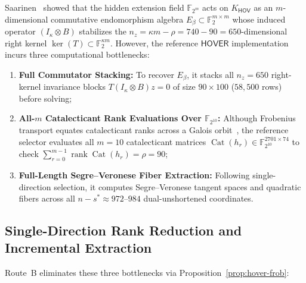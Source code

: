 \documentclass[11pt,a4paper]{article}
\theoremstyle{definition}
\theoremstyle{remark}
\newcommand{\F}{\mathbb{F}}
\newcommand{\rk}{\operatorname{rank}}
\newcommand{\Cat}{\operatorname{Cat}}
\newcommand{\HOV}{\mathsf{HOV}}
\newcommand{\HOVER}{\mathsf{HOVER}}
\begin{document}
Saarinen~\cite{Saa26a} showed that the hidden extension field $\F_{2^m}$ acts on $K_{\HOV}$ as an $m$-dimensional commutative endomorphism algebra $E_\beta \subset \F_2^{m \times m}$ whose induced operator $(I_\kappa \otimes B)$ stabilizes the $n_z = \kappa m - \rho = 740 - 90 = 650$-dimensional right kernel $\ker(T) \subset \F_2^{\kappa m}$. However, the reference $\HOVER$ implementation~\cite{Saa26a} incurs three computational bottlenecks:
\begin{enumerate}[leftmargin=2em]
    \item \textbf{Full Commutator Stacking:} To recover $E_\beta$, it stacks all $n_z = 650$ right-kernel invariance blocks $T(I_\kappa \otimes B)z = 0$ of size $90 \times 100$ ($58{,}500$ rows) before solving;
    \item \textbf{All-$m$ Catalecticant Rank Evaluations Over $\F_{2^{10}}$:} Although Frobenius transport equates catalecticant ranks across a Galois orbit~\cite{Saa26a}, the reference selector evaluates all $m = 10$ catalecticant matrices $\Cat(h_r) \in \F_{2^{10}}^{2701 \times 74}$ to check $\sum_{r=0}^{m-1} \rk\Cat(h_r) = \rho = 90$;
    \item \textbf{Full-Length Segre--Veronese Fiber Extraction:} Following single-direction selection, it computes Segre--Veronese tangent spaces and quadratic fibers across all $n - s^* \approx 972\text{--}984$ dual-unshortened coordinates.
\end{enumerate}

\subsection{Single-Direction Rank Reduction and Incremental Extraction}
Route~B eliminates these three bottlenecks via Proposition~\ref{prop:hover-frob}:
\end{document}
